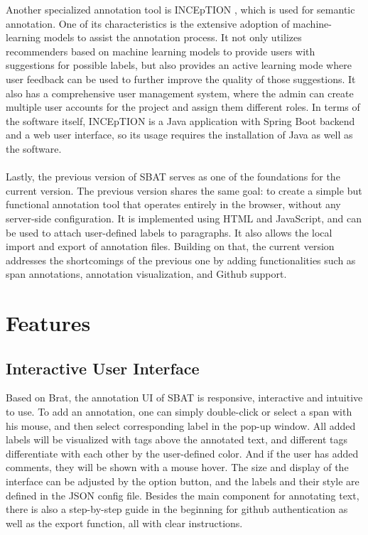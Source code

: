 \documentclass[12ptm a4paper]{article}
\begin{document}
Another specialized annotation tool is INCEpTION \cite{klie-etal-2018-inception}, which is used for semantic annotation. One of its characteristics is the extensive adoption of machine-learning models to assist the annotation process. It not only utilizes recommenders based on machine learning models to provide users with suggestions for possible labels, but also provides an active learning mode where user feedback can be used to further improve the quality of those suggestions. It also has a comprehensive user management system, where the admin can create multiple user accounts for the project and assign them different roles. In terms of the software itself, INCEpTION is a Java application with Spring Boot backend and a web user interface, so its usage requires the installation of Java as well as the software.\\
\\
Lastly, the previous version of SBAT \cite{SBAT} serves as one of the foundations for the current version. The previous version shares the same goal: to create a simple but functional annotation tool that operates entirely in the browser, without any server-side configuration. It is implemented using HTML and JavaScript, and can be used to attach user-defined labels to paragraphs. It also allows the local import and export of annotation files. Building on that, the current version addresses the shortcomings of the previous one by adding functionalities such as span annotations, annotation visualization, and Github support.
\section{Features}
\subsection{Interactive User Interface}
Based on Brat, the annotation UI of SBAT is responsive, interactive and intuitive to use. To add an annotation, one can simply double-click or select a span with his mouse, and then select corresponding label in the pop-up window. All added labels will be visualized with tags above the annotated text, and different tags differentiate with each other by the user-defined color. And if the user has added comments, they will be shown with a mouse hover. The size and display of the interface can be adjusted by the option button, and the labels and their style are defined in the JSON config file. Besides the main component for annotating text, there is also a step-by-step guide in the beginning for github authentication as well as the export function, all with clear instructions.
\end{document}
